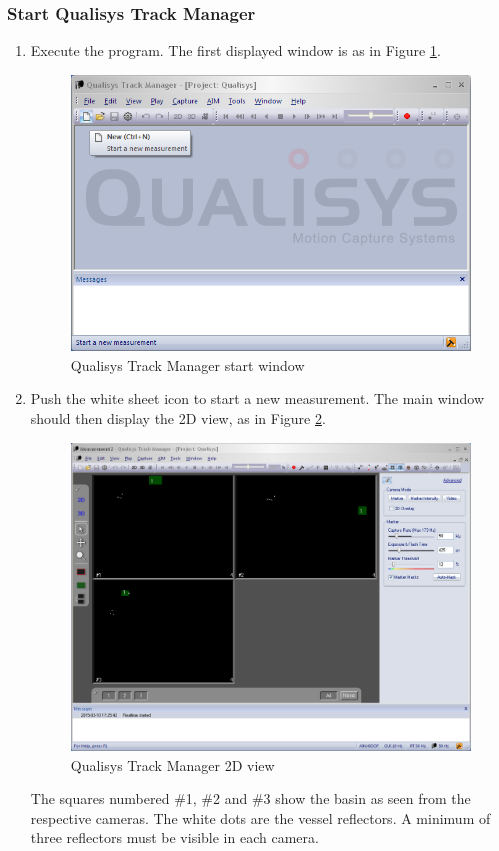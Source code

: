 \documentclass[a4paper,english]{report}
\begin{document}
\subsubsection*{Start Qualisys Track Manager}
\begin{enumerate}
	\item Execute the program. The first displayed window is as in Figure \ref{fig: Qualisys Track Manager start window}.
		\begin{figure}[!h]
			\centering \includegraphics[width=1\textwidth]{fig/qualisys_new} 
			\caption{Qualisys Track Manager start window}
			\label{fig: Qualisys Track Manager start window}
		\end{figure}
	\item Push the white sheet icon to start a new measurement. The main window should then display the 2D view, as in Figure \ref{fig: Qualisys Track Manager 2D view}.
		\begin{figure}[!h]
			\centering 
			\includegraphics[width=1\textwidth]{fig/qualisys_3cams} 
			\caption{Qualisys Track Manager 2D view} 
			\label{fig: Qualisys Track Manager 2D view}
		\end{figure}
	The squares numbered \#1, \#2 and \#3 show the basin as seen from the respective cameras. The white dots are the vessel reflectors. A minimum of three reflectors must be visible in each camera. 
\end{enumerate}
\end{document}
